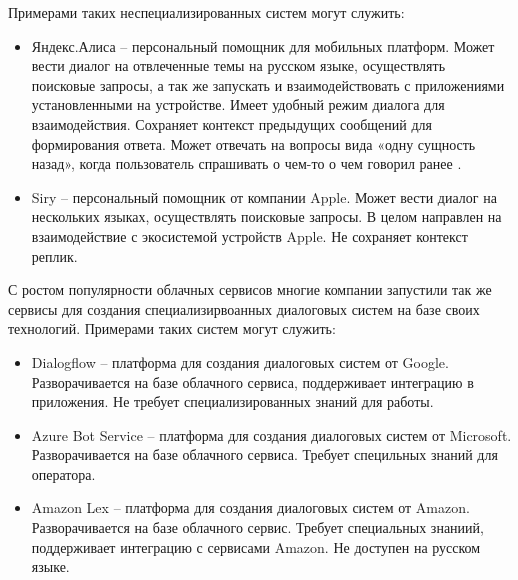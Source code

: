 Примерами таких неспециализированных систем могут служить: 
\begin{itemize}
\item Яндекс.Алиса – персональный помощник для мобильных платформ. Может вести диалог на отвлеченные темы на русском языке, осуществлять поисковые запросы, а так же запускать и взаимодействовать с приложениями установленными на устройстве. Имеет удобный режим диалога для взаимодействия. Сохраняет контекст предыдущих сообщений для формирования ответа. Может отвечать на вопросы вида «одну сущность назад», когда пользователь спрашивать о чем-то о чем говорил ранее \cite{fonarev2017riemannian}. 
\item Siry – персональный помощник от компании Apple. Может вести диалог на нескольких языках, осуществлять поисковые запросы. В целом направлен на взаимодействие с экосистемой устройств Apple. Не сохраняет контекст реплик. 
\end{itemize}
С ростом популярности облачных сервисов многие компании запустили так же сервисы для создания специализирвоанных диалоговых систем на базе своих технологий. 
Примерами таких систем могут служить:
\begin{itemize}
    \item Dialogflow – платформа для создания диалоговых систем от Google. Разворачивается на базе облачного сервиса, поддерживает интеграцию в приложения. Не требует специализированных знаний для работы.
    \item Azure Bot Service – платформа для создания диалоговых систем от Microsoft. Разворачивается на базе облачного сервиса. Требует специльных знаний для оператора.
    \item Amazon Lex – платформа для создания диалоговых систем от Amazon. Разворачивается на базе облачного сервис. Требует специальных знаниий, поддерживает интеграцию с сервисами Amazon. Не доступен на русском языке. 
\end{itemize}
 
 
